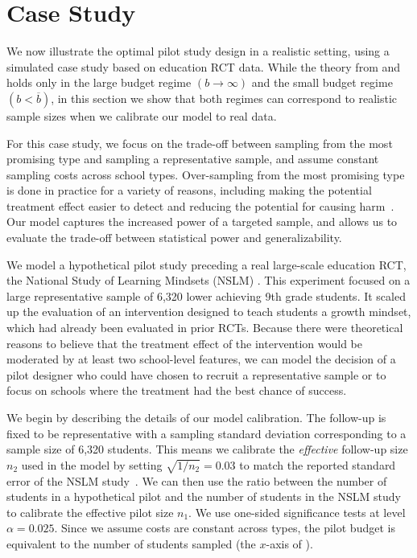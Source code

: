 \section{Case Study}
\label{sec:case-study}

We now illustrate the optimal pilot study design in a realistic setting, using a simulated case study based on education RCT data.
While the theory from  and  holds only in the large budget regime $(b\to\infty)$ and the small budget regime $(b<\overline{b})$, in this section we show that both regimes can correspond to realistic sample sizes when we calibrate our model to real data.

For this case study, we focus on the trade-off between sampling from the most promising type and sampling a representative sample, and assume constant sampling costs across school types.
Over-sampling from the most promising type is done in practice for a variety of reasons, including making the potential treatment effect easier to detect and reducing the potential for causing harm~\cite{FDACD19}.
Our model captures the increased power of a targeted sample, and allows us to evaluate the trade-off between statistical power and generalizability.

We model a hypothetical pilot study preceding a real large-scale education RCT, the National Study of Learning Mindsets (NSLM) \cite{YeagerHa19}.
This experiment focused on a large representative sample of 6,320 lower achieving 9th grade students.
It scaled up the evaluation of an intervention designed to teach students a growth mindset, which had already been evaluated in prior RCTs.
Because there were theoretical reasons to believe that the treatment effect of the intervention would be moderated by at least two school-level features, we can model the decision of a pilot designer who could have chosen to recruit a representative sample or to focus on schools where the treatment had the best chance of success.

We begin by describing the details of our model calibration.
The follow-up is fixed to be representative with a sampling standard deviation corresponding to a sample size of 6,320 students.
This means we calibrate the \emph{effective} follow-up size $n_2$ used in the model by setting $\sqrt{1 / n_2} = 0.03$ to match the reported standard error of the NSLM study~\cite{YeagerHa19}.
We can then use the ratio between the number of students in a hypothetical pilot and the number of students in the NSLM study to calibrate the effective pilot size $n_1$.
We use one-sided significance tests at level $\alpha = 0.025$.
Since we assume costs are constant across types, the pilot budget is equivalent to the number of students sampled (the $x$-axis of ).


